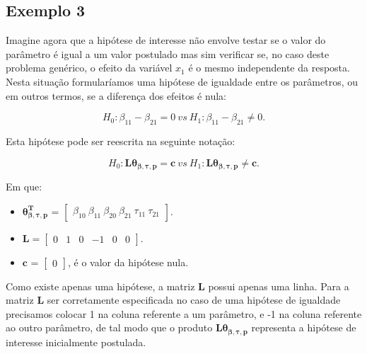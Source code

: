 \subsection{Exemplo 3}

Imagine agora que a hipótese de interesse não envolve testar se o valor do parâmetro é igual a um valor postulado mas sim verificar se, no caso deste problema genérico, o efeito da variável $x_1$ é o mesmo independente da resposta. Nesta situação formularíamos uma hipótese de igualdade entre os parâmetros, ou em outros termos, se a diferença dos efeitos é nula:

\begin{equation}
H_0: \beta_{11} - \beta_{21} = 0 \ vs \ H_1: \beta_{11} - \beta_{21} \neq 0.
\end{equation}

Esta hipótese pode ser reescrita na seguinte notação:

$$H_0: \boldsymbol{L}\boldsymbol{\theta_{\beta,\tau,p}} = \boldsymbol{c} \ vs \ H_1: \boldsymbol{L}\boldsymbol{\theta_{\beta,\tau,p}} \neq \boldsymbol{c}.$$ 

Em que:

\begin{itemize}
  
  \item $\boldsymbol{\theta_{\beta,\tau,p}^T}$ = $\begin{bmatrix} \beta_{10} \  \beta_{11} \ \beta_{20} \ \beta_{21} \ \tau_{11} \ \tau_{21} \end{bmatrix}$.


\item $\boldsymbol{L} = \begin{bmatrix} 0 & 1 & 0 & -1 & 0 & 0  \end{bmatrix}.$
 
\item $\boldsymbol{c}$ = $\begin{bmatrix} 0 \end{bmatrix}$, é o valor da hipótese nula. 

\end{itemize}

Como existe apenas uma hipótese, a matriz $\boldsymbol{L}$ possui apenas uma linha. Para a matriz $\boldsymbol{L}$ ser corretamente especificada no caso de uma hipótese de igualdade precisamos colocar 1 na coluna referente a um parâmetro, e -1 na coluna referente ao outro parâmetro, de tal modo que o produto $\boldsymbol{L}\boldsymbol{\theta_{\beta,\tau,p}}$ representa a hipótese de interesse inicialmente postulada.

